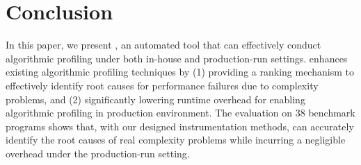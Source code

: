 \section{Conclusion}
\label{sec:con}

In this paper, we present \Tool, an automated tool that can effectively conduct algorithmic profiling
under both in-house and production-run settings.
\Tool enhances existing algorithmic profiling techniques by 
(1) providing a ranking mechanism to effectively identify root 
causes for performance failures due to complexity problems, 
and (2) significantly lowering runtime overhead 
for enabling algorithmic profiling in production environment. 
The evaluation on 38 benchmark programs shows that, with our designed instrumentation
methods, \Tool can accurately identify the root causes 
of real complexity problems
while incurring a negligible overhead under the production-run setting. 

